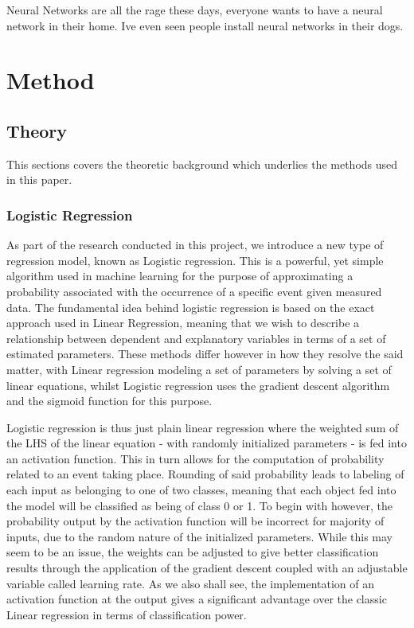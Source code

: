 \documentclass[onecolumn,10pt,cleanfoot]{asme2ej}
\begin{document}
Neural Networks are all the rage these days, everyone wants to have a neural network in their home. Ive even seen people install neural networks in their dogs.




\section{Method}

\subsection{Theory}

This sections covers the theoretic background which underlies the methods used in this paper.

\subsubsection{Logistic Regression}

As part of the research conducted in this project, we introduce a new type of regression model, known as Logistic regression. This is a powerful, yet simple algorithm used in machine learning for the purpose of approximating a probability associated with the occurrence of a specific event given measured data. The fundamental idea behind logistic regression is based on the exact approach used in Linear Regression, meaning that we wish to describe a relationship between dependent and explanatory variables in terms of a set of estimated parameters. These methods differ however in how they resolve the said matter, with Linear regression modeling a set of parameters by solving a set of linear equations, whilst Logistic regression uses the gradient descent algorithm and the sigmoid function for this purpose. 

Logistic regression is thus just plain linear regression where the weighted sum of the LHS of the linear equation - with randomly initialized parameters - is fed into an activation function. This in turn allows for the computation of probability related to an event taking place. Rounding of said probability leads to labeling of each input as belonging to one of two classes, meaning that each object fed into the model will be classified as being of class 0 or 1. To begin with however, the probability output by the activation function will be incorrect for majority of inputs, due to the random nature of the initialized parameters. While this may seem to be an issue, the weights can be adjusted to give better classification results through the application of the gradient descent coupled with an adjustable variable called learning rate. As we also shall see, the implementation of an activation function at the output gives a significant advantage over the classic Linear regression in terms of classification power.
 
\end{document}
